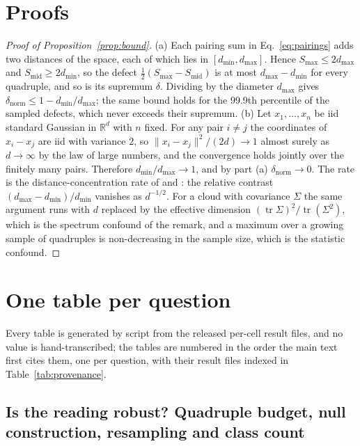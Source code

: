 \documentclass{article}
\theoremstyle{definition}
\theoremstyle{plain}
\theoremstyle{remark}
\begin{document}
\clearpage
\appendix
\raggedbottom
\section{Proofs}
\label{app:proofs}

\begin{proof}[Proof of Proposition~\ref{prop:bound}]
(a) Each pairing sum in Eq.~\ref{eq:pairings} adds two distances of the space, each of which lies in $[d_{\min}, d_{\max}]$. Hence $S_{\max}\le 2d_{\max}$ and $S_{\mathrm{mid}}\ge 2d_{\min}$, so the defect $\tfrac12(S_{\max}-S_{\mathrm{mid}})$ is at most $d_{\max}-d_{\min}$ for every quadruple, and so is its supremum $\delta$. Dividing by the diameter $d_{\max}$ gives $\delta_{\text{norm}}\le 1-d_{\min}/d_{\max}$; the same bound holds for the 99.9th percentile of the sampled defects, which never exceeds their supremum.
(b) Let $x_1,\dots,x_n$ be iid standard Gaussian in $\mathbb{R}^d$ with $n$ fixed. For any pair $i\ne j$ the coordinates of $x_i-x_j$ are iid with variance $2$, so $\|x_i-x_j\|^2/(2d)\to1$ almost surely as $d\to\infty$ by the law of large numbers, and the convergence holds jointly over the finitely many pairs. Therefore $d_{\min}/d_{\max}\to1$, and by part (a) $\delta_{\text{norm}}\to0$. The rate is the distance-concentration rate of \citet{beyer1999nearest} and \citet{aggarwal2001surprising}: the relative contrast $(d_{\max}-d_{\min})/d_{\min}$ vanishes as $d^{-1/2}$. For a cloud with covariance $\Sigma$ the same argument runs with $d$ replaced by the effective dimension $(\operatorname{tr}\Sigma)^2/\operatorname{tr}(\Sigma^2)$, which is the spectrum confound of the remark, and a maximum over a growing sample of quadruples is non-decreasing in the sample size, which is the statistic confound.
\end{proof}

\section{One table per question}
\label{app:tables}
Every table is generated by script from the released per-cell result files, and no value is hand-transcribed; the tables are numbered in the order the main text first cites them, one per question, with their result files indexed in Table~\ref{tab:provenance}.

\FloatBarrier
\subsection{Is the reading robust? Quadruple budget, null construction, resampling and class count}
\label{app:robust}
\label{app:csweep}
\end{document}
